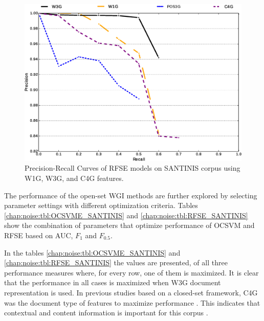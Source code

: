 \begin{figure}[t]
	\begin{center}
    \includegraphics[scale=0.45]{Figures/RFSE_Best_per_DocRep.eps}
	\caption{Precision-Recall Curves of RFSE models on SANTINIS corpus using W1G, W3G, and C4G features.}
	\label{chap:noise:fig:MacroPRC_RFSE_W3G_W1G_C4G_OPTIMAL_SANTINIS}
	\end{center}
\end{figure}

The performance of the open-set WGI methods are further explored by selecting parameter settings with different optimization criteria. Tables \ref{chap:noise:tbl:OCSVME_SANTINIS} and \ref{chap:noise:tbl:RFSE_SANTINIS} show the combination of parameters that optimize performance of OCSVM and RFSE based on AUC, $F_{1}$ and $F_{0.5}$. 

In the tables \ref{chap:noise:tbl:OCSVME_SANTINIS} and \ref{chap:noise:tbl:RFSE_SANTINIS} the values are presented, of all three performance measures where, for every row, one of them is maximized. It is clear that the performance in all cases is maximized when W3G document representation is used. In previous studies based on a closed-set framework, C4G was the document type of features to maximize performance \parencite{Sharroff2010}. This indicates that contextual and content information is important for this corpus \parencite{Asheghi2015}.

